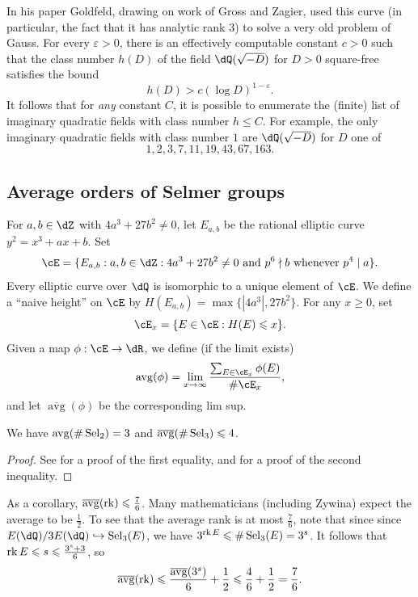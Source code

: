 In his paper \cite{go85} Goldfeld, drawing on work of Gross and Zagier,  
used this curve (in particular, the fact that it has analytic rank $3$) to 
solve a very old problem of Gauss. For every $\varepsilon>0$, there is an 
effectively computable constant $c>0$ such that the class number 
$h(D)$ of the field $\dQ(\sqrt{-D})$ for $D>0$ square-free satisfies the bound 
\[
  h(D) > c \left(\log D\right)^{1-\varepsilon} \text{.}
\]
It follows that for \emph{any} constant $C$, it is possible to enumerate the 
(finite) list of imaginary quadratic fields with class number $h\leqslant C$. 
For example, the only imaginary quadratic fields with class number $1$ are 
$\dQ(\sqrt{-D})$ for $D$ one of 
\[
  1,2,3,7,11,19,43,67,163 \text{.}
\]






\subsection{Average orders of Selmer groups}

For $a,b\in \dZ$ with $4 a^3+27 b^2\ne 0$, let $E_{a,b}$ be the rational 
elliptic curve $y^2=x^3+a x+b$. Set 
\[
  \cE = \{E_{a,b} : a,b\in \dZ : 4 a^3+27 b^2\ne 0\text{ and $p^6\nmid b$ whenever $p^4\mid a$}\} \text{.}
\]
Every elliptic curve over $\dQ$ is isomorphic to a unique element of $\cE$. 
We define a ``naive height'' on $\cE$ by $H(E_{a,b}) =\max\{|4 a^3|, 27 b^2\}$. 
For any $x\geqslant 0$, set 
\[
  \cE_{x} = \{E\in \cE : H(E)\leqslant x\} \text{.}
\]
Given a map $\phi:\cE\to \dR$, we define (if the limit exists) 
\[
  \operatorname{avg}(\phi) = \lim_{x\to \infty} \frac{ \sum_{E\in \cE_x} \phi(E)}{\# \cE_x} \text{,}
\]
and let $\overline{\operatorname{avg}}(\phi)$ be the corresponding lim sup. 

\begin{theorem}
We have 
$\operatorname{avg}(\# \operatorname{Sel}_2) = 3$ and 
$\overline{\operatorname{avg}}(\# \operatorname{Sel}_3) \leqslant 4$. 
\end{theorem}
\begin{proof}
See \cite{bh10-1} for a proof of the first equality, and \cite{bh10} for a 
proof of the second inequality. 
\end{proof}

As a corollary, $\overline{\operatorname{avg}}(\operatorname{rk}) \leqslant \frac 7 6$. 
Many mathematicians (including Zywina) expect the average to be $\frac 1 2$. 
To see that the average rank is at most $\frac 7 6$, note that since 
since $E(\dQ)/ 3E(\dQ)\hookrightarrow \selmer_3 (E)$, we have 
$3^{\operatorname{rk} E}\leqslant \#\operatorname{Sel}_3(E)=3^s$. It follows that 
$\operatorname{rk} E\leqslant s\leqslant \frac{3^s+3}{6}$, so 
\[
  \overline{\operatorname{avg}}(\operatorname{rk} ) \leqslant \frac{\overline{\operatorname{avg}}(3^s)}{6} + \frac 1 2 \leqslant \frac 4 6 + \frac 1 2 = \frac 7 6 \text{.}
\]





